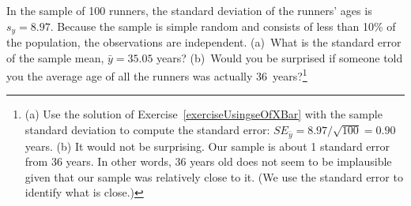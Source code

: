 
\begin{exercise}
In the sample of 100 runners, the standard deviation of the runners' ages is $s_y = 8.97$. Because the sample is simple random and consists of less than 10\% of the population, the observations are independent. (a)~What is the standard error of the sample mean, $\bar{y}=35.05$ years? (b)~Would you be surprised if someone told you the average age of all the runners was actually 36~years?\footnote{(a) 
Use the solution of Exercise~\ref{exerciseUsingseOfXBar}
with the sample standard deviation to compute the standard error: $SE_{\bar{y}} = 8.97/\sqrt{100} = 0.90$ years. (b) It would not be surprising. Our sample is about 1 standard error from 36 years. In other words, 36 years old does not seem to be implausible given that our sample was relatively close to it. (We use the standard error to identify what is close.)}
\end{exercise}


